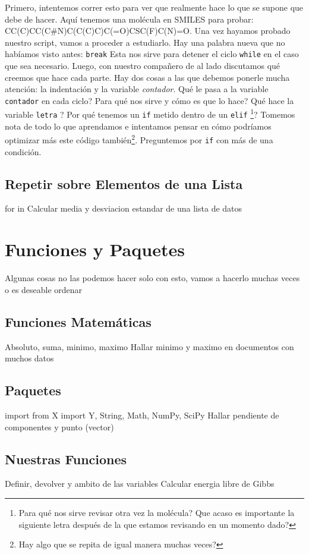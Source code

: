 \documentclass[10pt,letterpaper]{article}
\newcommand{\inlinecode}[1]{
\colorbox{light-gray}{\texttt{#1}}
}
\begin{document}
Primero, intentemos correr esto para ver que realmente hace lo que se supone que debe de hacer. Aqu\'i tenemos una mol\'ecula en SMILES para probar: CC(C)CC(C\#N)C(C(C)C)C(=O)CSC(F)C(N)=O. Una vez hayamos probado nuestro script, vamos a proceder a estudiarlo. Hay una palabra nueva que no hab\'iamos visto antes: \inlinecode{break} Esta nos sirve para detener el ciclo \inlinecode{while} en el caso que sea necesario. Luego, con nuestro compa\~nero de al lado discutamos qu\'e creemos que hace cada parte. Hay dos cosas a las que debemos ponerle mucha atenci\'on: la indentaci\'on y la variable \emph{contador}. Qu\'e le pasa a la variable \inlinecode{contador} en cada ciclo? Para qu\'e nos sirve y c\'omo es que lo hace? Qu\'e hace la variable \inlinecode{letra}? Por qu\'e tenemos un \inlinecode{if} metido dentro de un \inlinecode{elif}\footnote{Para qu\'e nos sirve revisar otra vez la mol\'ecula? Que acaso es importante la siguiente letra despu\'es de la que estamos revisando en un momento dado?}? Tomemos nota de todo lo que aprendamos e intentamos pensar en c\'omo podr\'iamos optimizar m\'as este c\'odigo tambi\'en\footnote{Hay algo que se repita de igual manera muchas veces?}. Preguntemos por \inlinecode{if} con m\'as de una condici\'on.

\subsection{Repetir sobre Elementos de una Lista}
for in
Calcular media y desviacion estandar de una lista de datos
\section{Funciones y Paquetes}
Algunas cosas no las podemos hacer solo con esto, vamos a hacerlo muchas veces o es deseable ordenar
\subsection{Funciones Matem\'aticas}
Absoluto, suma, minimo, maximo
Hallar minimo y maximo en documentos con muchos datos
\subsection{Paquetes}
import from X import Y, String, Math, NumPy, SciPy
Hallar pendiente de componentes y punto (vector)
\subsection{Nuestras Funciones}
Definir, devolver y ambito de las variables
Calcular energia libre de Gibbs
\end{document}
